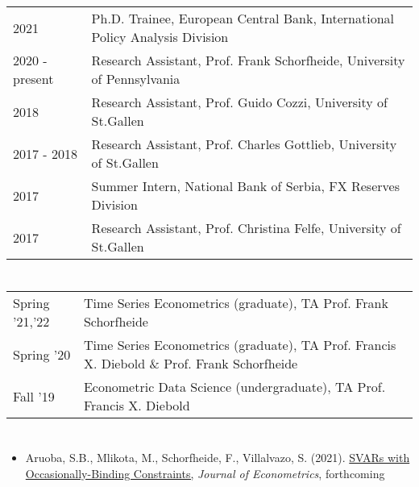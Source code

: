 \documentclass[letter,10pt]{article}
\newcommand{\spacebeforeitems}{\vspace*{8pt}}
\newcommand{\rowspace}{2pt} %
\newcommand{\myEmph}[1]{#1}
\begin{document}
\begin{table}[h!]
	\begin{tabular}{p{2.5cm}p{15cm}}
		2021  & \myEmph{Ph.D. Trainee,} European Central Bank, International Policy Analysis Division \\[\rowspace]
		2020 - present & \myEmph{Research Assistant,} Prof. Frank Schorfheide, University of Pennsylvania \\[\rowspace]
		2018  & \myEmph{Research Assistant,} Prof. Guido Cozzi, University of St.Gallen \\[\rowspace]
		2017 - 2018 & \myEmph{Research Assistant,} Prof. Charles Gottlieb, University of St.Gallen \\[\rowspace]
		2017 & \myEmph{Summer Intern,} National Bank of Serbia, FX Reserves Division \\[\rowspace]
		2017 & \myEmph{Research Assistant,} Prof. Christina Felfe, University of St.Gallen \\
	\end{tabular}
\end{table}



\section*{}

\begin{table}[h!]
	\begin{tabular}{p{2.5cm}p{15cm}}
		Spring '21,'22  & \myEmph{Time Series Econometrics (graduate),} TA Prof. Frank Schorfheide\\[\rowspace]
		Spring '20  & \myEmph{Time Series Econometrics (graduate),} TA Prof. Francis X. Diebold \& Prof. Frank Schorfheide\\[\rowspace]
		Fall '19  & \myEmph{Econometric Data Science (undergraduate),} TA Prof. Francis X. Diebold\\
	\end{tabular}
\end{table}



\section*{}

\spacebeforeitems

\begin{itemize}
	\item Aruoba, S.B., Mlikota, M., Schorfheide, F., Villalvazo, S. (2021). \href{https://www.sciencedirect.com/science/article/abs/pii/S0304407621002487?dgcid=author}{SVARs with Occasionally-Binding Constraints,} \textit{Journal of Econometrics}, forthcoming
\end{itemize}
\end{document}
